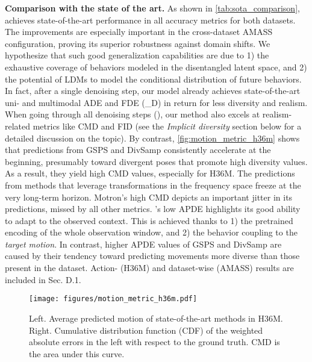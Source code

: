 \documentclass[10pt,twocolumn,letterpaper]{article}
\begin{document}
\textbf{Comparison with the state of the art.} As shown in \autoref{tab:sota_comparison}, \modelname{} achieves state-of-the-art performance in all accuracy metrics for both datasets. The improvements are especially important in the cross-dataset AMASS configuration, proving its superior robustness against domain shifts. We hypothesize that such good generalization capabilities are due to 1) the exhaustive coverage of behaviors modeled in the disentangled latent space, and 2) the potential of LDMs to model the conditional distribution of future behaviors. In fact, after a single denoising step, our model already achieves state-of-the-art uni- and multimodal ADE and FDE (\modelname{}\_D) in return for less diversity and realism.
When going through all denoising steps (\modelname{}), our method also excels at realism-related metrics like CMD and FID (see the \textit{Implicit diversity} section below for a detailed discussion on the topic).
By contrast, \autoref{fig:motion_metric_h36m} shows that predictions from GSPS and DivSamp consistently accelerate at the beginning, presumably toward divergent poses that promote high diversity values. As a result, they yield high CMD values, especially for H36M.  
The predictions from methods that leverage transformations in the frequency space freeze at the very long-term horizon. 
Motron's high CMD depicts an important jitter in its predictions, missed by all other metrics.
\modelname{}'s low APDE highlights its good ability to adapt to the observed context. This is achieved thanks to 1) the pretrained encoding of the whole observation window, and 2) the behavior coupling to the \textit{target motion}. In contrast, higher APDE values of GSPS and DivSamp are caused by their tendency toward predicting movements more diverse than those present in the dataset. Action- (H36M) and dataset-wise (AMASS) results are included in \supp{} Sec. D.1. 

\begin{figure}
    \centering
    \texttt{[image: figures/motion\_metric\_h36m.pdf]}
    \vspace{-0.5cm}
    \caption{Left. Average predicted motion of state-of-the-art methods in H36M. Right. Cumulative distribution function (CDF) of the weighted absolute errors in the left with respect to the ground truth. CMD is the area under this curve.}
    \label{fig:motion_metric_h36m}
    \vspace{-0.4cm}
\end{figure}
\end{document}
